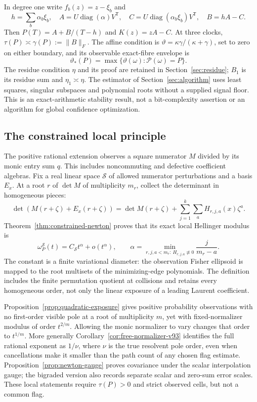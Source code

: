 \documentclass[11pt,reqno]{amsart}
\numberwithin{equation}{section}
\theoremstyle{definition}\newtheorem{definition}[theorem]{Definition}
\theoremstyle{remark}\newtheorem{remark}[theorem]{Remark}
\newcommand{\diag}{\operatorname{diag}}
\newcommand{\sig}{\vartheta}
\begin{document}
In degree one write $f_b(z)=z-\xi_b$ and
\begin{equation}\label{eq:affine}
 h=\sum_b\alpha_b\xi_b,\quad
 A=U\diag(\alpha)V^{\mathsf T},\quad
 C=U\diag(\alpha_b\xi_b)V^{\mathsf T},\quad B=hA-C.
\end{equation}
Then $P(T)=A+B/(T-h)$ and $K(z)=zA-C$. At three clocks,
$\tau(P)\asymp\gamma(P):=\|B\|_F$. The affine condition is
$\sig=\kappa\gamma/(\kappa+\gamma)$, set to zero on either boundary,
and its observable exact-fibre envelope is
\begin{equation}\label{eq:envelope}
 \sig_*(P)=\max\{\sig(\omega):\mathcal P(\omega)=P\}.
\end{equation}
The residue condition $\eta$ and its proof are retained in
Section~\ref{sec:residue}; $B_1$ is its residue sum and
$\eta_1\asymp\eta$. The estimator of Section~\ref{sec:algorithm}
uses least squares, singular subspaces and polynomial roots without
a supplied signal floor. This is an exact-arithmetic stability result,
not a bit-complexity assertion or an algorithm for global confidence
optimization.

\subsection{The constrained local principle}
The positive rational extension observes a square numerator $M$ divided
by its monic entry sum $q$. This includes noncommuting and defective
coefficient algebras. Fix a real linear space $\mathcal S$ of allowed
numerator perturbations and a basis $E_x$. At a root $r$ of $\det M$
of multiplicity $m_r$, collect the determinant in homogeneous pieces:
\[
 \det(M(r+\zeta)+E_x(r+\zeta))
 =\det M(r+\zeta)+\sum_{j=1}^k\sum_aH_{r,j,a}(x)\zeta^a.
\]
Theorem~\ref{thm:constrained-newton} proves that its exact local
Hellinger modulus is
\[
 \omega_P^{\mathcal S}(t)=C_{\mathcal S}t^\alpha+o(t^\alpha),
 \qquad
 \alpha=\min_{r,j,a<m_r:\ H_{r,j,a}\not\equiv0}
                         \frac{j}{m_r-a}.
\]
The constant is a finite variational diameter: the observation Fisher
ellipsoid is mapped to the root multisets of the minimizing-edge
polynomials. The definition includes the finite permutation quotient
at collisions and retains every homogeneous order, not only the
linear exposure of a leading Laurent coefficient.

Proposition~\ref{prop:quadratic-exposure} gives positive probability
observations with no first-order visible pole at a root of multiplicity
$m$, yet with fixed-normalizer modulus of order $t^{2/m}$.
Allowing the monic normalizer to vary changes that order to $t^{1/m}$.
More generally Corollary~\ref{cor:free-normalizer-v93} identifies the
full rational exponent as $1/\nu$, where $\nu$ is the true resolvent
pole order, even when cancellations make it smaller than the path
count of any chosen flag estimate. Proposition~\ref{prop:newton-gauge}
proves covariance under the scalar interpolation gauge; the
bigraded version also records separate scalar and zero-sum error
scales. These local statements require $\tau(P)>0$ and strict
observed cells, but not a common flag.
\end{document}
